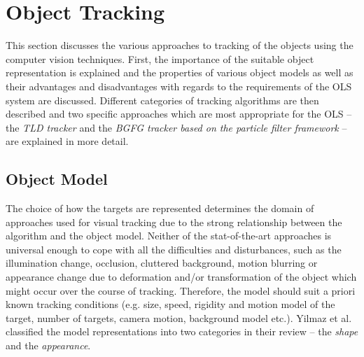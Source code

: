 \section{Object Tracking} \label{txt:object_tracking}

This section discusses the various approaches to tracking of the objects using the computer vision techniques. First, the importance of the suitable object representation is explained and the properties of various object models as well as their advantages and disadvantages with regards to the requirements of the OLS system are discussed. Different categories of tracking algorithms are then described and two specific approaches which are most appropriate for the OLS -- the \textit{TLD tracker} and the \textit{BGFG tracker based on the particle filter framework} -- are explained in more detail.

\subsection{Object Model} \label{txt:object_model}

The choice of how the targets are represented determines the domain of approaches used for visual tracking due to the strong relationship between the algorithm and the object model. Neither of the stat-of-the-art approaches is universal enough to cope with all the difficulties and disturbances, such as the illumination change, occlusion, cluttered background, motion blurring or appearance change due to deformation and/or transformation of the object \cite{Li:2013:SAM:2508037.2508039} which might occur over the course of tracking. Therefore, the model should suit a priori known tracking conditions (e.g. size, speed, rigidity and motion model of the target, number of targets, camera motion, background model etc.). Yilmaz et al. classified the model representations into two categories in their review \cite{Yilmaz:2006:OTS:1177352.1177355} -- the \textit{shape} and the \textit{appearance}. 



